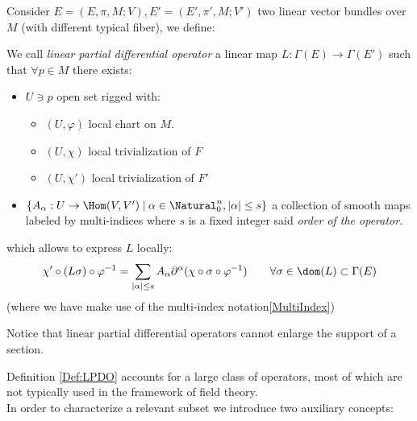 \documentclass[Main]{subfiles}
\begin{document}
		Consider $E=(E,\pi,M;V), E'=(E',\pi',M;V')$ two linear vector bundles over $M$ (with different typical fiber), we define:
		\begin{definition}\label{Def:LPDO}
			We call \emph{linear partial differential operator} a 
			linear map $L:\Gamma(E)\rightarrow \Gamma(E')$ such that $\forall p \in M$ there exists:
		\begin{itemize}
			\item $U \ni p$ open set rigged with:
				\begin{itemize}
					\item $(U, \varphi )$ local chart on $M$.
					\item $(U, \chi)$ local trivialization of $F$
					\item $(U, \chi')$ local trivialization of $F'$
				\end{itemize}
			\item $\{A_\alpha :U \rightarrow \Hom(V,V')\; \vert \: \alpha \in \Natural_0^n, \vert \alpha \vert \leq s \}$ 
			a collection of smooth maps labeled by multi-indices where $s$ is a fixed integer said \emph{order of the operator}.
		\end{itemize}
		which allows to express $L$ locally:
		\begin{displaymath}
			\chi' \circ ( L \sigma) \circ \varphi^{-1} =
			\sum_{\vert \alpha \vert \leq s} A_\alpha \partial^\alpha (\chi \circ \sigma \circ \varphi^{-1} ) 
			\qquad \forall \sigma \in \dom(L) \subset \Gamma(E)
		\end{displaymath}
		(where we have make use of the multi-index notation\ref{MultiIndex})
	\end{definition}
		\begin{remark}\label{Obs:EnlargeSupport}
			Notice that linear partial differential operators cannot enlarge the support of a section.
		\end{remark}
		
		Definition \ref{Def:LPDO} accounts for a large class of operators, most of which are not typically used in the framework of field theory.\\
		In order to characterize a relevant subset we introduce two auxiliary concepts:
		
\end{document}
